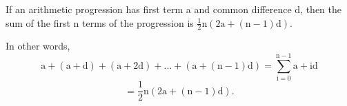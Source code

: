 If an arithmetic progression has first term a and common difference
d, then the sum of the first n terms of the progression is
$ \frac{1}{2} \mathrm{n} ( 2 \mathrm{a} + ( \mathrm{n} - 1 ) \mathrm{d} ) . $
\par
In other words, 
\[ \mathrm{a}
+ ( \mathrm{a+d} )
+ ( \mathrm{a+2d} )
+ ...
+ ( \mathrm{a+(n-1)d} )
= \sum _{\mathrm{i=0}} ^{\mathrm{n}-1} \mathrm{a+id} \]
\[ = \frac{1}{2} \mathrm{n} ( 2 \mathrm{a} + ( \mathrm{n} - 1 ) \mathrm{d} ) . \]